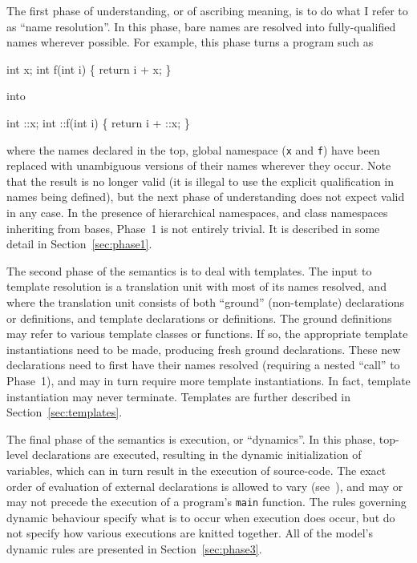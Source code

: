 \documentclass[11pt]{article}
\begin{document}
The first phase of understanding, or
of ascribing meaning, is to do what I refer to as ``name resolution''.
In this phase, bare names are resolved into fully-qualified names
wherever possible.  For example, this phase turns a program such as
\begin{stdrule}
   int x;
   int f(int i) \{ return i + x; \}
\end{stdrule}
into
\begin{stdrule}
   int ::x;
   int ::f(int i) \{ return i + ::x; \}
\end{stdrule}
where the names declared in the top, global namespace (\texttt{x} and
\texttt{f}) have been replaced with unambiguous versions of their
names wherever they occur.  Note that the result is no longer valid
\cpp{} (it is illegal to use the explicit qualification in names being
defined), but the next phase of understanding does not expect valid
\cpp{} in any case.  In the presence of hierarchical namespaces, and
class namespaces inheriting from bases, Phase~1 is not entirely
trivial.  It is described in some detail in Section~\ref{sec:phase1}.

 The second phase of the semantics is to deal with
templates.  The input to template resolution is a translation unit
with most of its names resolved, and where the translation unit
consists of both ``ground'' (non-template) declarations or
definitions, and template declarations or definitions.  The ground
definitions may refer to various template classes or functions.  If
so, the appropriate template instantiations need to be made, producing
fresh ground declarations.  These new declarations need to first have
their names resolved (requiring a nested ``call'' to Phase~1), and may
in turn require more template instantiations.  In fact, template
instantiation may never terminate.  Templates are further described in
Section~\ref{sec:templates}.

The final phase of the semantics is execution, or ``dynamics''.  In
this phase, top-level declarations are executed, resulting in the
dynamic initialization of variables, which can in turn result in the
execution of source-code.  The exact order of evaluation of external
declarations is allowed to vary
(see~\cite[\S3.6.2]{cpp-standard-iso14882}), and may or may not
precede the execution of a program's \texttt{main} function.  The
rules governing dynamic behaviour specify what is to occur when
execution does occur, but do not specify how various executions are
knitted together.  All of the model's dynamic rules are presented in
Section~\ref{sec:phase3}.
\end{document}
